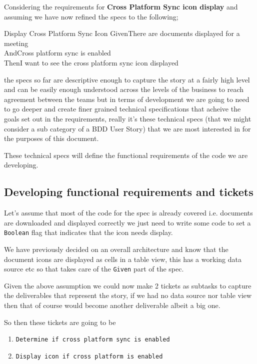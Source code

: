 \documentclass[a4paper, titlepage]{article}
\begin{document}
  Considering the requirements for \textbf{Cross Platform Sync icon display}
  and assuming we have now refined the specs to the following;

  \begin{tspec}{1}{Display Cross Platform Sync Icon}
    \ac{Given}{There are documents displayed for a meeting}\\
    \ac{And}{Cross platform sync is enabled}\\
    \ac{Then}{I want to see the cross platform sync icon displayed}
  \end{tspec}

  the specs so far are descriptive enough to capture
  the story at a fairly high level and can be easily enough
  understood across the levels of the business  to reach agreement
  between the teams but in terms of
  development we are going to need to go deeper and create finer grained
  technical specifications that acheive the goals set out in the
  requirements, really it's these technical specs
  (that we might consider a sub category of a BDD User Story) that we
  are most interested in for the purposes of this document.

  These technical specs will define the functional requirements of the code we are
  developing.

  \subsection{Developing functional requirements and tickets}
   Let's assume that most of the code for the spec is already covered i.e. documents
  are downloaded and displayed correctly we just need to write some code
  to set a \texttt{Boolean} flag that indicates that the icon needs display.

  We have previously decided on an overall architecture and know that the document
  icons are displayed as cells in a table view, this has a working data
  source etc so that takes care of the \texttt{Given} part of the
  spec. 

  Given the above assumption we could now make 2 tickets as subtasks to capture the
  deliverables that represent the story, if we had no data source nor
  table view then that of course would become another deliverable
  albeit a big one.
  
  So then these tickets are going to be 

  \begin{enumerate}
    \item{\texttt{Determine if cross platform sync is enabled}}
    \item{\texttt{Display icon if cross platform is enabled}}
  \end{enumerate}
  
\end{document}
